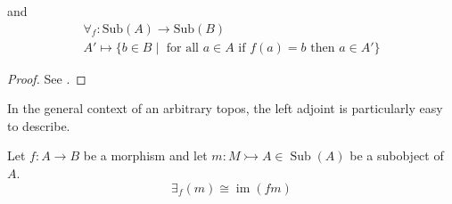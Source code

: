 \documentclass{tac}
\newcommand{\lto}{\longrightarrow}
\begin{document}
	and
	\begin{gather*}
		\forall_f: \text{Sub}(A) \to \text{Sub}(B)\\
		A' \mapsto \lbrace b \in B \mid \text{ for all }a \in A\text{ if }f(a) = b\text{ then }a \in A'\rbrace
	\end{gather*}
	\begin{proof}
		See \cite[\S1 9.2]{MM}.
	\end{proof}
	In the general context of an arbitrary topos, the left adjoint is particularly easy to describe.
	\begin{lemma}
		Let $f:A \lto B$ be a morphism and let $m: M \rightarrowtail A \in \operatorname{Sub}(A)$ be a subobject of $A$.
		\begin{equation}
			\exists_f(m) \cong \operatorname{im}(fm)
		\end{equation}
	\end{lemma}
\end{document}
